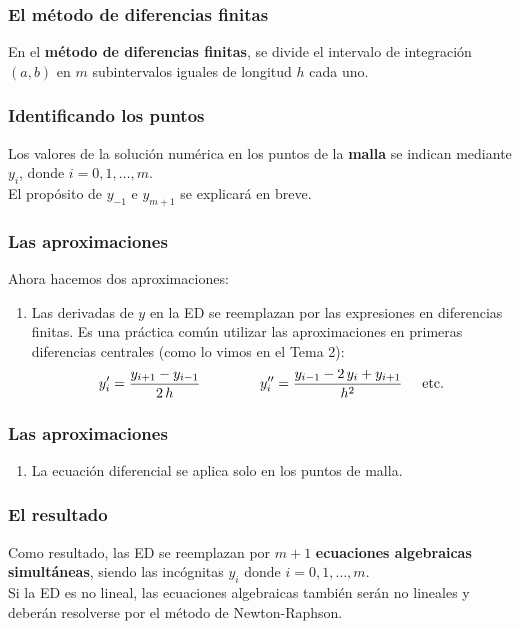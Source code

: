 \documentclass[12pt]{beamer}
\begin{document}
\begin{frame}
\frametitle{El método de diferencias finitas}
En el \textbf{\textcolor{burgundy}{método de diferencias finitas}}, se divide el intervalo de integración $(a, b)$ en $m$ subintervalos iguales de longitud $h$ cada uno.

\end{frame}
\begin{frame}
\frametitle{Identificando los puntos}
Los valores de la solución numérica en los puntos de la \textbf{\textcolor{cadmiumgreen}{malla}} se indican mediante $y_{i}$, donde $i = 0, 1, \ldots, m$.
\\
\bigskip
\pause
El propósito de $y_{-1} $ e $y_{m+1}$ se explicará en breve.
\end{frame}
\begin{frame}
\frametitle{Las aproximaciones}
Ahora hacemos dos aproximaciones:
\pause
\\
\bigskip
\pause
{}
\begin{enumerate}
\item Las derivadas de $y$ en la ED se reemplazan por las expresiones en diferencias finitas. Es una práctica común utilizar las aproximaciones en primeras diferencias centrales (como lo vimos en el Tema 2):
\begin{align}
{y}^{\prime}_{i} = \dfrac{y_{i+1} - y_{i-1}}{2 \, h} \hspace{1.5cm} {y}^{\prime \prime}_{i} = \dfrac{y_{i-1} - 2 \, y_{i} +  y_{i+1}}{h^{2}} \hspace{0.5cm} \text{etc.}
\end{align}
\seti
\end{enumerate}
\end{frame}
\begin{frame}
\frametitle{Las aproximaciones}
\begin{enumerate}[<+->]
\item La ecuación diferencial se aplica solo en los puntos de malla.
\end{enumerate}
\end{frame}
\begin{frame}
\frametitle{El resultado}
Como resultado, las ED se reemplazan por $m + 1$ \textbf{\textcolor{chestnut}{ecuaciones algebraicas simultáneas}}, \pause siendo las incógnitas $y_{i}$ donde $i = 0, 1, \ldots, m$.
\\
\bigskip
Si la ED es no lineal, las ecuaciones algebraicas también serán no lineales y deberán resolverse por el método de Newton-Raphson.
\end{frame}
\end{document}
